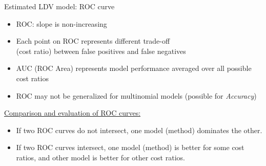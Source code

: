 \documentclass[usenames,dvipsnames]{beamer}
\begin{document}
\begin{frame}{Estimated LDV model: ROC curve}
\begin{itemize}
\item ROC: slope is non-increasing
\item Each point on ROC represents different trade-off \\(cost ratio) between false positives and false negatives
\item AUC (ROC Area) represents model performance averaged over all possible cost ratios 
\item ROC may not be generalized for multinomial models (possible for \textit{Accuracy})
\end{itemize} 
\quad \underline{Comparison and evaluation of ROC curves:}\\
\begin{itemize}
\item If two ROC curves do not intersect, one model (method) dominates the other.
\item If two ROC curves intersect, one model (method) is better for some cost ratios, and other model is better for other cost ratios.
\end{itemize}
\end{frame}
\end{document}
